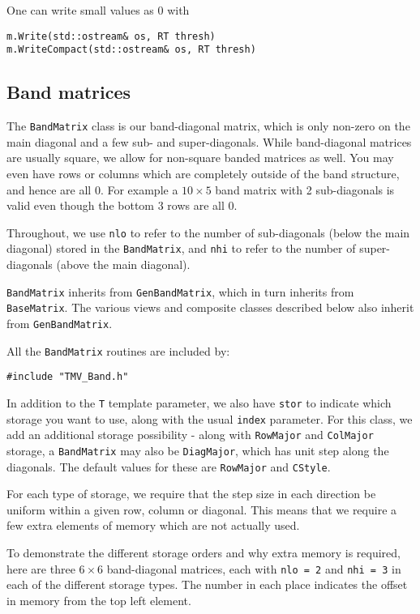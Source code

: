 \documentclass[twoside,letterpaper,11pt]{article}
\renewcommand{\tt}[1]{{\texttt {#1}}}
\begin{document}
One can write small values as 0 with
\begin{verbatim}
m.Write(std::ostream& os, RT thresh)
m.WriteCompact(std::ostream& os, RT thresh)
\end{verbatim}

\subsection{Band matrices}

The \tt{BandMatrix} class is our band-diagonal matrix, which is only non-zero
on the main diagonal and a few sub- and super-diagonals.  While band-diagonal
matrices are usually square, we allow for non-square banded matrices as well.
You may even have rows or columns which are completely outside of the 
band structure, and hence are all 0.  For example a $10\times 5$ band matrix
with 2 sub-diagonals is valid even though the bottom 3 rows are all 0.

Throughout, we use \tt{nlo} to refer to the number of sub-diagonals 
(below the main diagonal) stored
in the \tt{BandMatrix}, and \tt{nhi} to refer to the number of super-diagonals
(above the main diagonal).

\tt{BandMatrix} inherits from \tt{GenBandMatrix}, which in turn inherits from
\tt{BaseMatrix}.  
The various views and composite classes described below 
also inherit from \tt{GenBandMatrix}.

All the \tt{BandMatrix} routines are included by:
\begin{verbatim}
#include "TMV_Band.h"
\end{verbatim}

In addition to the \tt{T} template parameter, we also have \tt{stor} to indicate 
which storage you want to use, along with the usual \tt{index} parameter.
For this class, we add an additional storage possibility - 
along with \tt{RowMajor} and 
\tt{ColMajor} storage, a \tt{BandMatrix} may also be \tt{DiagMajor}, which 
has unit step along the diagonals.
The default values for these are \tt{RowMajor} and \tt{CStyle}.

For each type of storage, we require that the step size in each direction
be uniform within a given row, column or diagonal. 
This means that we require a few extra elements
of memory which are not actually used.

To demonstrate the different storage orders and why extra memory is required, 
here are three $6 \times 6$ band-diagonal
matrices, each with \tt{nlo = 2} and \tt{nhi = 3} in each of the different storage
types.  The number in each place indicates the offset in memory from the 
top left element.
\end{document}
